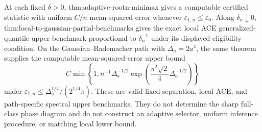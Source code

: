 At each fixed \(\delta>0\), \(\text{thm:adaptive-rootn-minimax}\) gives a computable certified statistic with uniform \(C/n\) mean-squared error whenever \(\varepsilon_{1,n}\le\varepsilon_0\).  Along \(\delta_n\downarrow0\), \(\text{thm:local-to-gaussian-partial-benchmarks}\) gives the exact local ACE generalized-quantile upper benchmark proportional to \(\delta_n^{-1}\) under its displayed eligibility condition.  On the Gaussian--Rademacher path with \(\Delta_a=2a^4\), the same theorem supplies the computable mean-squared-error upper bound
\[
 C\min\!\left\{1,n^{-1}\Delta_a^{-1/2}
 \exp\!\left(\frac{\pi^2\sqrt2}{4}\Delta_a^{-1/2}\right)\right\}
\]
under \(\varepsilon_{1,n}\le\Delta_a^{1/4}/(2^{1/4}\pi)\).  These are valid fixed-separation, local-ACE, and path-specific spectral upper benchmarks.  They do not determine the sharp full-class phase diagram and do not construct an adaptive selector, uniform inference procedure, or matching local lower bound.